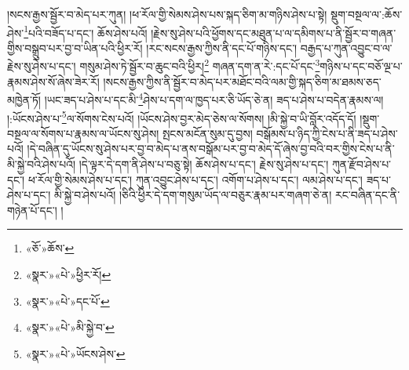 །སངས་རྒྱས་སྦྱོར་བ་མེད་པར་ཀུན། །ཕ་རོལ་གྱི་སེམས་ཤེས་པས་སྐད་ཅིག་མ་གཉིས་ཤེས་པ་སྟེ། སྡུག་བསྔལ་ལ་:ཆོས་ཤེས་\footnote{«ཅོ་»ཆོས་}པའི་བཟོད་པ་དང་། ཆོས་ཤེས་པའོ། །རྗེས་སུ་ཤེས་པའི་ཕྱོགས་དང་མཐུན་པ་ལ་དམིགས་པ་ནི་སྦྱོར་བ་གཞན་གྱིས་བསྒྲུབ་པར་བྱ་བ་ཡིན་པའི་ཕྱིར་རོ། །རང་སངས་རྒྱས་ཀྱིས་ནི་དང་པོ་གཉིས་དང་། བརྒྱད་པ་ཀུན་འབྱུང་བ་ལ་རྗེས་སུ་ཤེས་པ་དང་། གསུམ་ཤེས་ཏེ་སྦྱོར་བ་ཆུང་བའི་ཕྱིར།\footnote{«སྣར་»«པེ་»ཕྱིར་རོ།} གཞན་དག་ན་རེ་:དང་པོ་དང་\footnote{«སྣར་»«པེ་»དང་པོ་}གཉིས་པ་དང་བཅོ་ལྔ་པ་རྣམས་ཤེས་སོ་ཞེས་ཟེར་རོ། །སངས་རྒྱས་ཀྱིས་ནི་སྦྱོར་བ་མེད་པར་མཐོང་བའི་ལམ་གྱི་སྐད་ཅིག་མ་ཐམས་ཅད་མཁྱེན་ཏོ། །ཡང་ཟད་པ་ཤེས་པ་དང་མི་\footnote{«སྣར་»«པེ་»མི་སྐྱེ་བ་}ཤེས་པ་དག་ལ་ཁྱད་པར་ཅི་ཡོད་ཅེ་ན། ཟད་པ་ཤེས་པ་བདེན་རྣམས་ལ། །:ཡོངས་ཤེས་པ་\footnote{«སྣར་»«པེ་»ཡོངས་ཤེས་}ལ་སོགས་ངེས་པའོ། །ཡོངས་ཤེས་བྱར་མེད་ཅེས་ལ་སོགས། །མི་སྐྱེ་བ་ཡི་བློར་འདོད་དོ། །སྡུག་བསྔལ་ལ་སོགས་པ་རྣམས་ལ་ཡོངས་སུ་ཤེས། སྤངས་མངོན་སུམ་དུ་བྱས། བསྒོམས་པ་ཉིད་ཀྱི་ངེས་པ་ནི་ཟད་པ་ཤེས་པའོ། །དེ་བཞིན་དུ་ཡོངས་སུ་ཤེས་པར་བྱ་བ་མེད་པ་ནས་བསྒོམ་པར་བྱ་བ་མེད་དོ་ཞེས་བྱ་བའི་བར་གྱིས་ངེས་པ་ནི་མི་སྐྱེ་བའི་ཤེས་པའོ། །དེ་ལྟར་དེ་དག་ནི་ཤེས་པ་བཅུ་སྟེ། ཆོས་ཤེས་པ་དང་། རྗེས་སུ་ཤེས་པ་དང་། ཀུན་རྫོབ་ཤེས་པ་དང་། ཕ་རོལ་གྱི་སེམས་ཤེས་པ་དང་། ཀུན་འབྱུང་ཤེས་པ་དང་། འགོག་པ་ཤེས་པ་དང་། ལམ་ཤེས་པ་དང་། ཟད་པ་ཤེས་པ་དང་། མི་སྐྱེ་བ་ཤེས་པའོ། །ཅིའི་ཕྱིར་དེ་དག་གསུམ་ཡོད་ལ་བཅུར་རྣམ་པར་གཞག་ཅེ་ན། རང་བཞིན་དང་ནི་གཉེན་པོ་དང་། །
